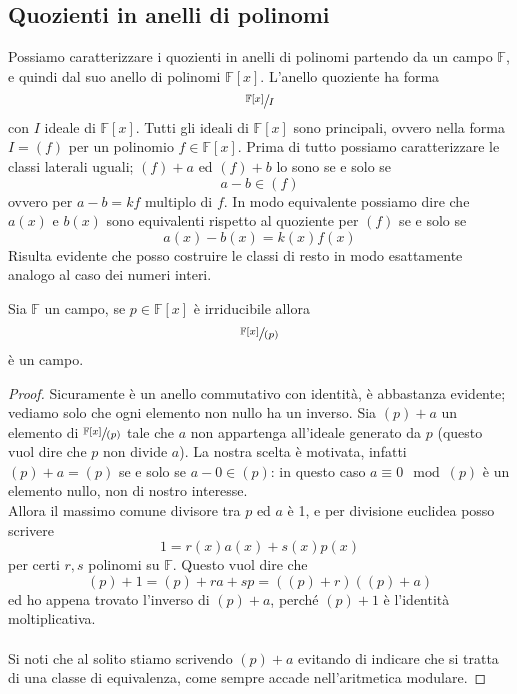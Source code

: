 \subsection{Quozienti in anelli di polinomi}
Possiamo caratterizzare i quozienti in anelli di polinomi partendo da un campo $\mathbb{F}$, e quindi dal suo anello di polinomi $\mathbb{F}[x]$. L'anello quoziente ha forma 
\begin{equation*}
\sfrac{\mathbb{F}[x]}{I}
\end{equation*}
con $I$ ideale di $\mathbb{F}[x]$. Tutti gli ideali di $\mathbb{F}[x]$ sono principali, ovvero nella forma $I=(f)$ per un polinomio $f\in\mathbb{F}[x]$. Prima di tutto possiamo caratterizzare le classi laterali uguali; $(f)+a$ ed $(f)+b$ lo sono se e solo se 
\begin{equation*}
a-b\in(f)
\end{equation*}
ovvero per $a-b=kf$ multiplo di $f$. In modo equivalente possiamo dire che $a(x)$ e $b(x)$ sono equivalenti rispetto al quoziente per $(f)$ se e solo se
\begin{equation*}
a(x)-b(x)=k(x)f(x)
\end{equation*}
Risulta evidente che posso costruire le classi di resto in modo esattamente analogo al caso dei numeri interi.
\begin{proposizione}
	Sia $\mathbb{F}$ un campo, se $p\in\mathbb{F}[x]$ è irriducibile allora 
	\begin{equation*}
	\sfrac{\mathbb{F}[x]}{(p)}
	\end{equation*}
	è un campo.
\end{proposizione}
\begin{proof}
	Sicuramente è un anello commutativo con identità, è abbastanza evidente; vediamo solo che ogni elemento non nullo ha un inverso. Sia $(p)+a$ un elemento di $\sfrac{\mathbb{F}[x]}{(p)}$ tale che $a$ non appartenga all'ideale generato da $p$ (questo vuol dire che $p$ non divide $a$). La nostra scelta è motivata, infatti $(p)+a=(p)$ se e solo se $a-0\in(p)$: in questo caso $a \equiv 0 \mod (p)$ è un elemento nullo, non di nostro interesse. \\ Allora il massimo comune divisore tra $p$ ed $a$ è 1, e per divisione euclidea posso scrivere 
	\begin{equation*}
	1=r(x)a(x)+s(x)p(x)
	\end{equation*}
	per certi $r,s$ polinomi su $\mathbb{F}$. Questo vuol dire che 
	\begin{equation*}
	(p)+1=(p)+ra+sp=\left((p)+r\right)\left((p)+a\right)
	\end{equation*}
	ed ho appena trovato l'inverso di $(p)+a$, perché $(p)+1$ è l'identità moltiplicativa. \\ \\ Si noti che al solito stiamo scrivendo $(p)+a$ evitando di indicare che si tratta di una classe di equivalenza, come sempre accade nell'aritmetica modulare.
\end{proof}
